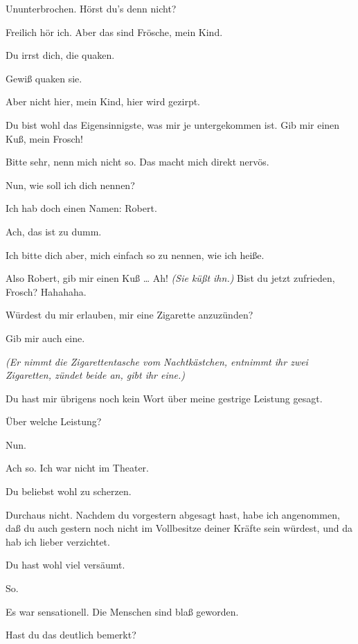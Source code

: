 \documentclass[
	final,
	a4paper,
	ngerman,
	mpinclude = true, %
	twoside = true,
	open = right,
	cleardoublepage = plain,
	DIV = 13,
	BCOR = 1cm,
	titlepage = firstiscover,
	]{scrbook}
\newcommand{\direction}[1]{\textit{(#1)}}
\newcommand{\thecharacter}[1]{\textup{\textsc{#1}}\xspace}
\newcommand{\thedichter}{\thecharacter{Dichter}}
\newcommand{\theschauspielerin}{\thecharacter{Schauspielerin}}
\newcommand{\character}[1]{\item[#1:]}
\newcommand{\dichter}{\character{\thedichter}}
\newcommand{\schauspielerin}{\character{\theschauspielerin}}
\begin{document}
\begin{play}
	\dichter
	Ununterbrochen. Hörst du's denn nicht?

	\schauspielerin
	Freilich hör ich. Aber das sind Frösche, mein Kind.

	\dichter
	Du irrst dich, die quaken.

	\schauspielerin
	Gewiß quaken sie.

	\dichter
	Aber nicht hier, mein Kind, hier wird gezirpt.

	\schauspielerin
	Du bist wohl das Eigensinnigste, was mir je untergekommen ist. Gib mir einen Kuß, mein Frosch!

	\dichter
	Bitte sehr, nenn mich nicht so. Das macht mich direkt nervös.

	\schauspielerin
	Nun, wie soll ich dich nennen?

	\dichter
	Ich hab doch einen Namen: Robert.

	\schauspielerin
	Ach, das ist zu dumm.

	\dichter
	Ich bitte dich aber, mich einfach so zu nennen, wie ich heiße.

	\schauspielerin
	Also Robert, gib mir einen Kuß \ldots{} Ah! \direction{Sie küßt ihn.} Bist du jetzt zufrieden, Frosch? Hahahaha.

	\dichter
	Würdest du mir erlauben, mir eine Zigarette anzuzünden?

	\schauspielerin
	Gib mir auch eine.

	\direction{Er nimmt die Zigarettentasche vom Nachtkästchen, entnimmt ihr zwei Zigaretten, zündet beide an, gibt ihr eine.}

	\schauspielerin
	Du hast mir übrigens noch kein Wort über meine gestrige Leistung gesagt.

	\dichter
	Über welche Leistung?

	\schauspielerin
	Nun.

	\dichter
	Ach so. Ich war nicht im Theater.

	\schauspielerin
	Du beliebst wohl zu scherzen.

	\dichter
	Durchaus nicht. Nachdem du vorgestern abgesagt hast, habe ich angenommen, daß du auch gestern noch nicht im Vollbesitze deiner Kräfte sein würdest, und da hab ich lieber verzichtet.

	\schauspielerin
	Du hast wohl viel versäumt.

	\dichter
	So.

	\schauspielerin
	Es war sensationell. Die Menschen sind blaß geworden.

	\dichter
	Hast du das deutlich bemerkt?


\end{play}
\end{document}
